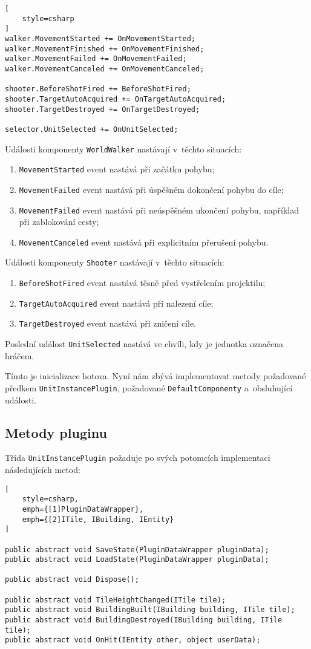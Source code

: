 \begin{lstlisting}[
	style=csharp
]
walker.MovementStarted += OnMovementStarted;
walker.MovementFinished += OnMovementFinished;
walker.MovementFailed += OnMovementFailed;
walker.MovementCanceled += OnMovementCanceled;

shooter.BeforeShotFired += BeforeShotFired;
shooter.TargetAutoAcquired += OnTargetAutoAcquired;
shooter.TargetDestroyed += OnTargetDestroyed;

selector.UnitSelected += OnUnitSelected;
\end{lstlisting}

Události komponenty \texttt{WorldWalker} nastávají v~těchto situacích:
\begin{enumerate}
	\item \texttt{MovementStarted} event nastává při začátku pohybu;
	\item \texttt{MovementFailed} event nastává při úspěšném dokončení pohybu do cíle;
	\item \texttt{MovementFailed} event nastává při neúspěšném ukončení pohybu, například při zablokování cesty;
	\item \texttt{MovementCanceled} event nastává při explicitním přerušení pohybu.
\end{enumerate}

Události komponenty \texttt{Shooter} nastávají v~těchto situacích:

\begin{enumerate}
	\item \texttt{BeforeShotFired} event nastává těsně před vystřelením projektilu;
	\item \texttt{TargetAutoAcquired} event nastává při nalezení cíle;
	\item \texttt{TargetDestroyed} event nastává při zničení cíle.
\end{enumerate}

Poslední událost \texttt{UnitSelected} nastává ve chvíli, kdy je jednotka označena hráčem.


Tímto je inicializace hotova. Nyní nám zbývá implementovat metody požadované předkem \texttt{UnitInstancePlugin}, požadované \texttt{DefaultComponenty} a~obsluhující události.

\subsection{Metody pluginu}

Třída \texttt{UnitInstancePlugin} požaduje po svých potomcích implementaci následujících metod:
\begin{lstlisting}[
	style=csharp,
	emph={[1]PluginDataWrapper},
	emph={[2]ITile, IBuilding, IEntity}
]

public abstract void SaveState(PluginDataWrapper pluginData);
public abstract void LoadState(PluginDataWrapper pluginData);

public abstract void Dispose();

public abstract void TileHeightChanged(ITile tile);
public abstract void BuildingBuilt(IBuilding building, ITile tile);
public abstract void BuildingDestroyed(IBuilding building, ITile tile);
public abstract void OnHit(IEntity other, object userData);
\end{lstlisting}


